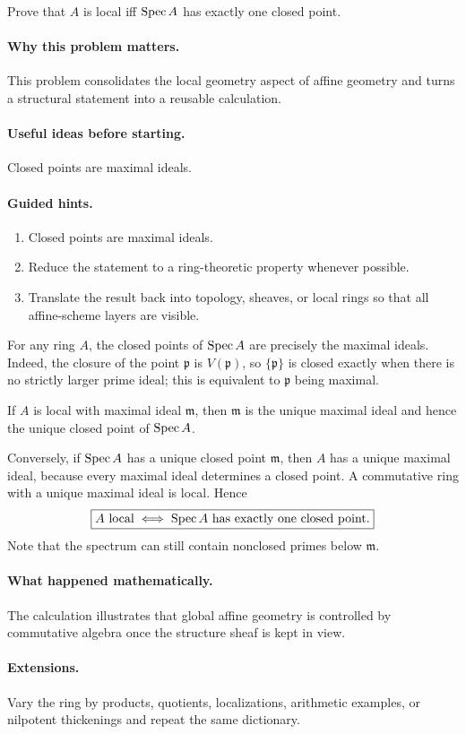 \begin{problem}\label{prob:vi18-p09}
Prove that $A$ is local iff $\operatorname{Spec} A$ has exactly one closed point.
\end{problem}

\ifdefined\FullProblemDossiers
\paragraph{Why this problem matters.}
This problem consolidates the local geometry aspect of affine geometry and turns a structural statement into a reusable calculation.

\paragraph{Useful ideas before starting.}
Closed points are maximal ideals.

\paragraph{Guided hints.}
\begin{enumerate}
\item Closed points are maximal ideals.
\item Reduce the statement to a ring-theoretic property whenever possible.
\item Translate the result back into topology, sheaves, or local rings so that all affine-scheme layers are visible.
\end{enumerate}

\begin{solution}
For any ring $A$, the closed points of $\operatorname{Spec} A$ are precisely the maximal ideals. Indeed, the closure of the point $\mathfrak p$ is $V(\mathfrak p)$, so $\{\mathfrak p\}$ is closed exactly when there is no strictly larger prime ideal; this is equivalent to $\mathfrak p$ being maximal.

If $A$ is local with maximal ideal $\mathfrak m$, then $\mathfrak m$ is the unique maximal ideal and hence the unique closed point of $\operatorname{Spec} A$.

Conversely, if $\operatorname{Spec} A$ has a unique closed point $\mathfrak m$, then $A$ has a unique maximal ideal, because every maximal ideal determines a closed point. A commutative ring with a unique maximal ideal is local. Hence
\[
\boxed{A\text{ local}\iff\operatorname{Spec} A\text{ has exactly one closed point}.}
\]
Note that the spectrum can still contain nonclosed primes below $\mathfrak m$.
\end{solution}


\paragraph{What happened mathematically.}
The calculation illustrates that global affine geometry is controlled by commutative algebra once the structure sheaf is kept in view.

\paragraph{Extensions.}
Vary the ring by products, quotients, localizations, arithmetic examples, or nilpotent thickenings and repeat the same dictionary.
\fi
